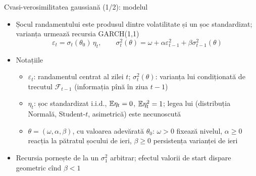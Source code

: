 \begin{frame}{Cvasi-verosimilitatea gaussiană (1/2): modelul}
\itemsize{\small}
\begin{itemize}
    \item Șocul randamentului este produsul dintre volatilitate și un șoc standardizat; varianța urmează recursia GARCH(1,1)
    \[ \varepsilon_t = \sigma_t(\theta_0)\,\eta_t, \qquad \sigma^2_t(\theta) = \omega + \alpha\varepsilon^2_{t-1} + \beta\sigma^2_{t-1}(\theta) \]
    \item Notațiile
    \begin{itemize}
        \item $\varepsilon_t$: randamentul centrat al zilei $t$; $\sigma^2_t(\theta)$: varianța lui condiționată de trecutul $\mathcal F_{t-1}$ (informația pînă în ziua $t-1$)
        \item $\eta_t$: șoc standardizat i.i.d., $\mathbb{E}\eta_t = 0$, $\mathbb{E}\eta_t^2 = 1$; legea lui (distribuția Normală, Student-$t$, asimetrică) este necunoscută
        \item $\theta = (\omega, \alpha, \beta)$, cu valoarea adevărată $\theta_0$: $\omega > 0$ fixează nivelul, $\alpha \ge 0$ reacția la pătratul șocului de ieri, $\beta \ge 0$ persistența varianței de ieri
    \end{itemize}
    \item Recursia pornește de la un $\sigma^2_1$ arbitrar; efectul valorii de start dispare geometric cînd $\beta < 1$
\end{itemize}
\end{frame}

